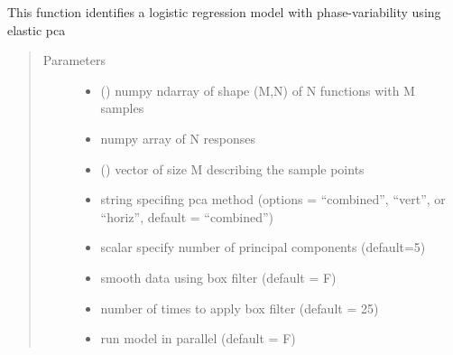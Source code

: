 \documentclass[letterpaper,10pt,english]{sphinxmanual}
\begin{document}
\begin{fulllineitems}
\begin{fulllineitems}
\label{\detokenize{pcr_regression:pcr_regression.elastic_mlpcr_regression.calc_model}}
This function identifies a logistic regression model with phase-variability
using elastic pca
\begin{quote}\begin{description}
\item[{Parameters}] \leavevmode\begin{itemize}
\item {} 
 () \textendash{} numpy ndarray of shape (M,N) of N functions with M samples

\item {} 
 \textendash{} numpy array of N responses

\item {} 
 () \textendash{} vector of size M describing the sample points

\item {} 
 \textendash{} string specifing pca method (options = “combined”,
“vert”, or “horiz”, default = “combined”)

\item {} 
 \textendash{} scalar specify number of principal components (default=5)

\item {} 
 \textendash{} smooth data using box filter (default = F)

\item {} 
 \textendash{} number of times to apply box filter (default = 25)

\item {} 
 \textendash{} run model in parallel (default = F)

\end{itemize}

\end{description}\end{quote}


\end{fulllineitems}
\end{fulllineitems}
\end{document}
